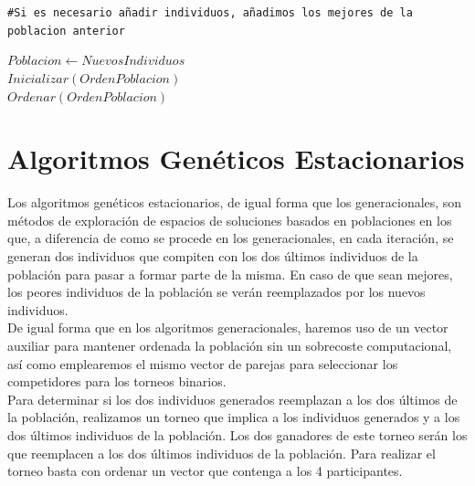 \documentclass[11pt,a4paper]{article}
\begin{document}
\begin{algorithm} [!h]
{{					\texttt{\#Si es necesario añadir individuos, añadimos los mejores de la poblacion anterior}\\
					
					$Poblacion \leftarrow NuevosIndividuos$\\
					$Inicializar(OrdenPoblacion)$\\
					$Ordenar(OrdenPoblacion)$\\
					
				}
				
				
			}
			
		\end{algorithm}
		
\section{Algoritmos Genéticos Estacionarios}

	\noindent Los algoritmos genéticos estacionarios, de igual forma que los generacionales, son métodos de exploración de espacios de soluciones basados en poblaciones en los que, a diferencia de como se procede en los generacionales, en cada iteración, se generan dos individuos que compiten con los dos últimos individuos de la población para pasar a formar parte de la misma. En caso de que sean mejores, los peores individuos de la población se verán reemplazados por los nuevos individuos.\\
	
	\noindent De igual forma que en los algoritmos generacionales, haremos uso de un vector auxiliar para mantener ordenada la población sin un sobrecoste computacional, así como emplearemos el mismo vector de parejas para seleccionar los competidores para los torneos binarios.\\
	
	\noindent Para determinar si los dos individuos generados reemplazan a los dos últimos de la población, realizamos un torneo que implica a los individuos generados y a los dos últimos individuos de la población. Los dos ganadores de este torneo serán los que reemplacen a los dos últimos individuos de la población. Para realizar el torneo basta con ordenar un vector que contenga a los 4 participantes.\\
	
\end{document}
